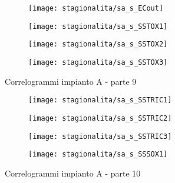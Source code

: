 \begin{sidewaysfigure}[h]\ContinuedFloat
	\renewcommand*\thesubfigure{(\arabic{subfigure})}
	\begin{subfigure}{0.49\textwidth}
		\texttt{[image: stagionalita/sa\_s\_ECout]}
		\caption{}
		\centering
	\end{subfigure}
	\begin{subfigure}{0.49\textwidth}
		\texttt{[image: stagionalita/sa\_s\_SSTOX1]}
		\caption{}
		\label{fig:sa_s_SSTOX1}
		\centering
	\end{subfigure}

	\begin{subfigure}{0.49\textwidth}
		\texttt{[image: stagionalita/sa\_s\_SSTOX2]}
		\caption{}
		\label{fig:sa_s_SSTOX2}
		\centering
	\end{subfigure}
	\begin{subfigure}{0.49\textwidth}
		\texttt{[image: stagionalita/sa\_s\_SSTOX3]}	
		\caption{}
		\label{fig:sa_s_SSTOX3}
		\centering
	\end{subfigure}
	\caption{Correlogrammi impianto A - parte 9}
\end{sidewaysfigure}

\begin{sidewaysfigure}[h]\ContinuedFloat
	\renewcommand*\thesubfigure{(\arabic{subfigure})}
	\begin{subfigure}{0.49\textwidth}
		\texttt{[image: stagionalita/sa\_s\_SSTRIC1]}
		\caption{}
		\centering
	\end{subfigure}
	\begin{subfigure}{0.49\textwidth}
		\texttt{[image: stagionalita/sa\_s\_SSTRIC2]}
		\caption{}
		\label{fig:sa_s_SSTRIC2}
		\centering
	\end{subfigure}

	\begin{subfigure}{0.49\textwidth}
		\texttt{[image: stagionalita/sa\_s\_SSTRIC3]}
		\caption{}
		\label{fig:sa_s_SSTRIC3}
		\centering
	\end{subfigure}
	\begin{subfigure}{0.49\textwidth}
		\texttt{[image: stagionalita/sa\_s\_SSSOX1]}	
		\caption{}
		\label{fig:sa_s_SSSOX1}
		\centering
	\end{subfigure}
	\caption{Correlogrammi impianto A - parte 10}
\end{sidewaysfigure}

